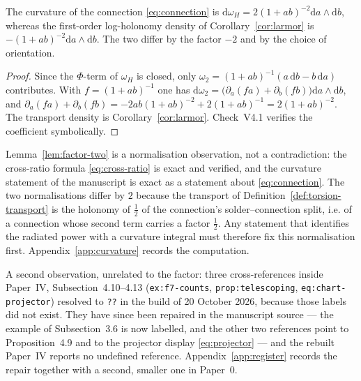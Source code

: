 \begin{lemma}
\label{lem:factor-two}
The curvature of the connection \eqref{eq:connection} is
$\mathrm d\omega_H=2(1+ab)^{-2}\mathrm da\wedge\mathrm db$, whereas the
first-order log-holonomy density of Corollary~\ref{cor:larmor} is
$-(1+ab)^{-2}\mathrm da\wedge\mathrm db$.  The two differ by the factor $-2$ and
by the choice of orientation.
\end{lemma}

\begin{proof}
Since the $\Phi$-term of $\omega_H$ is closed, only
$\omega_2=(1+ab)^{-1}(a\,\mathrm db-b\,\mathrm da)$ contributes.  With
$f=(1+ab)^{-1}$ one has $\mathrm d\omega_2=\bigl(\partial_a(fa)+\partial_b(fb)
\bigr)\mathrm da\wedge\mathrm db$, and
$\partial_a(fa)+\partial_b(fb)=-2ab(1+ab)^{-2}+2(1+ab)^{-1}=2(1+ab)^{-2}$.  The
transport density is Corollary~\ref{cor:larmor}.  Check~V4.1 verifies the
coefficient symbolically.
\end{proof}

\begin{remark}
\label{rem:factor-two}
Lemma~\ref{lem:factor-two} is a normalisation observation, not a contradiction:
the cross-ratio formula \eqref{eq:cross-ratio} is exact and verified, and the
curvature statement of the manuscript is exact as a statement about
\eqref{eq:connection}.  The two normalisations differ by $2$ because the
transport of Definition~\ref{def:torsion-transport} is the holonomy of
$\tfrac12$ of the connection's solder--connection split, i.e. of a connection
whose second term carries a factor $\tfrac12$.  Any statement that identifies
the radiated power with a curvature integral must therefore fix this
normalisation first.  Appendix~\ref{app:curvature} records the computation.

A second observation, unrelated to the factor: three cross-references inside
Paper~IV, Subsection~4.10--4.13 (\texttt{ex:f7-counts},
\texttt{prop:telescoping}, \texttt{eq:chart-projector}) resolved to
\texttt{??} in the build of 20 October 2026, because those labels did not exist.
They have since been repaired in the manuscript source --- the example of
Subsection~3.6 is now labelled, and the other two references point to
Proposition~4.9 and to the projector display \eqref{eq:projector} --- and the
rebuilt Paper~IV reports no undefined reference.
Appendix~\ref{app:register} records the repair together with a second, smaller
one in Paper~0.
\end{remark}

